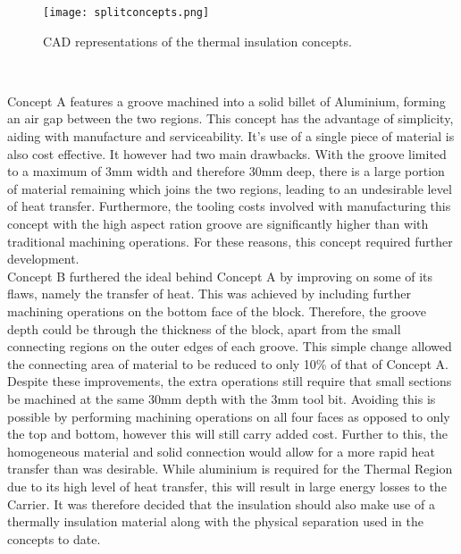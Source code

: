 \begin{figure}[!htb]
	\centering
	\texttt{[image: splitconcepts.png]}
	\caption[Thermal Insulation Concepts.]{CAD representations of the thermal insulation concepts.}
	\label{fig:splitconcepts}
\end{figure} 
\FloatBarrier

Concept A features a groove machined into a solid billet of Aluminium, forming an air gap between the two regions. This concept has the advantage of simplicity, aiding with manufacture and serviceability. It's use of a single piece of material is also cost effective. It however had two main drawbacks. With the groove limited to a maximum of 3mm width and therefore 30mm deep, there is a large portion of material remaining which joins the two regions, leading to an undesirable level of heat transfer. Furthermore, the tooling costs involved with manufacturing this concept with the high aspect ration groove are significantly higher than with traditional machining operations. For these reasons, this concept required further development.\\

Concept B furthered the ideal behind Concept A by improving on some of its flaws, namely the transfer of heat. This was achieved by including further machining operations on the bottom face of the block. Therefore, the groove depth could be through the thickness of the block, apart from the small connecting regions on the outer edges of each groove. This simple change allowed the connecting area of material to be reduced to only 10\% of that of Concept A. Despite these improvements, the extra operations still require that small sections be machined at the same 30mm depth with the 3mm tool bit. Avoiding this is possible by performing machining operations on all four faces as opposed to only the top and bottom, however this will still carry added cost. Further to this, the homogeneous material and solid connection would allow for a more rapid heat transfer than was desirable. While aluminium is required for the Thermal Region due to its high level of heat transfer, this will result in large energy losses to the Carrier. It was therefore decided that the insulation should also make use of a thermally insulation material along with the physical separation used in the concepts to date.\\

